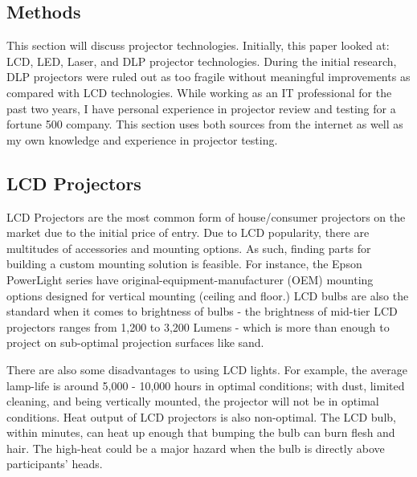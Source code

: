 \documentclass[IEEEtran]{article}
\begin{document}
\subsection{Methods}
This section will discuss projector technologies. Initially, this paper looked at: LCD, LED, Laser, and DLP projector technologies. During the initial research, DLP projectors were ruled out as too fragile without meaningful improvements as compared with LCD technologies. While working as an IT professional for the past two years, I have personal experience in projector review and testing for a fortune 500 company. This section uses both sources from the internet as well as my own knowledge and experience in projector testing.  

\subsection{LCD Projectors}
\par LCD Projectors are the most common form of house/consumer projectors on the market due to the initial price of entry.\cite{1} Due to LCD popularity, there are multitudes of accessories and mounting options. As such, finding parts for building a custom mounting solution is feasible. For instance, the Epson PowerLight series have original-equipment-manufacturer (OEM) mounting options designed for vertical mounting (ceiling and floor.) LCD bulbs are also the standard when it comes to brightness of bulbs - the brightness of mid-tier LCD projectors ranges from 1,200 to 3,200 Lumens - which is more than enough to project on sub-optimal projection surfaces like sand. 
\par There are also some disadvantages to using LCD lights. For example, the average lamp-life is around 5,000 - 10,000 hours in optimal conditions\cite{1}; with dust, limited cleaning, and being vertically mounted, the projector will not be in optimal conditions. Heat output of LCD projectors is also non-optimal. The LCD bulb, within minutes, can heat up enough that bumping the bulb can burn flesh and hair. The high-heat could be a  major hazard when the bulb is directly above participants' heads.  
\end{document}
